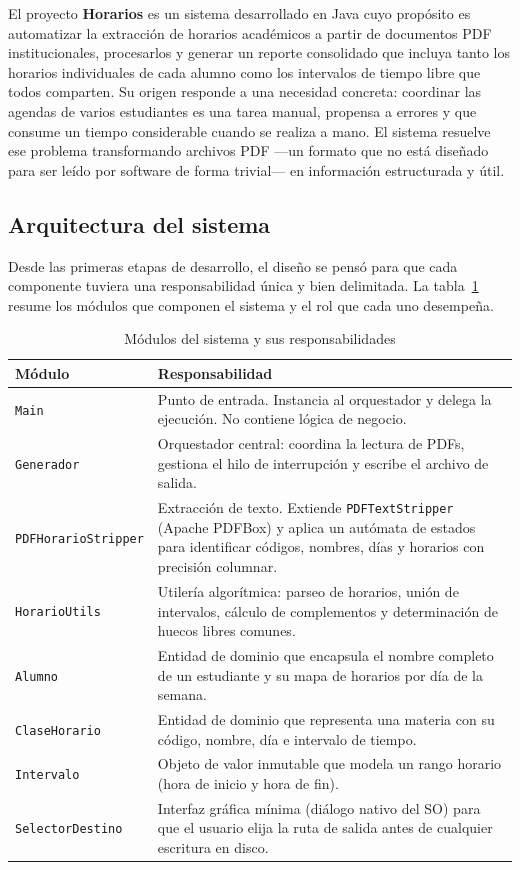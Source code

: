 El proyecto \textbf{Horarios} es un sistema desarrollado en Java cuyo propósito es automatizar la
extracción de horarios académicos a partir de documentos PDF institucionales, procesarlos y generar un
reporte consolidado que incluya tanto los horarios individuales de cada alumno como los intervalos
de tiempo libre que todos comparten. Su origen responde a una necesidad concreta: coordinar
las agendas de varios estudiantes es una tarea manual, propensa a errores y que consume un tiempo
considerable cuando se realiza a mano. El sistema resuelve ese problema transformando archivos PDF
—un formato que no está diseñado para ser leído por software de forma trivial— en información
estructurada y útil.

\subsection{Arquitectura del sistema}

Desde las primeras etapas de desarrollo, el diseño se pensó para que cada componente
tuviera una responsabilidad única y bien delimitada. La tabla~\ref{tab:modulos} resume los
módulos que componen el sistema y el rol que cada uno desempeña.

\begin{table}[H]
\centering
\caption{Módulos del sistema y sus responsabilidades}
\label{tab:modulos}
\begin{tabular}{|l|p{9.5cm}|}
\hline
\textbf{Módulo} & \textbf{Responsabilidad} \\
\hline
\texttt{Main}              & Punto de entrada. Instancia al orquestador y delega la ejecución. No contiene lógica de negocio. \\
\hline
\texttt{Generador}         & Orquestador central: coordina la lectura de PDFs, gestiona el hilo de interrupción y escribe el archivo de salida. \\
\hline
\texttt{PDFHorarioStripper} & Extracción de texto. Extiende \texttt{PDFTextStripper} (Apache PDFBox) y aplica un autómata de estados para identificar códigos, nombres, días y horarios con precisión columnar. \\
\hline
\texttt{HorarioUtils}      & Utilería algorítmica: parseo de horarios, unión de intervalos, cálculo de complementos y determinación de huecos libres comunes. \\
\hline
\texttt{Alumno}            & Entidad de dominio que encapsula el nombre completo de un estudiante y su mapa de horarios por día de la semana. \\
\hline
\texttt{ClaseHorario}      & Entidad de dominio que representa una materia con su código, nombre, día e intervalo de tiempo. \\
\hline
\texttt{Intervalo}         & Objeto de valor inmutable que modela un rango horario (hora de inicio y hora de fin). \\
\hline
\texttt{SelectorDestino}   & Interfaz gráfica mínima (diálogo nativo del SO) para que el usuario elija la ruta de salida antes de cualquier escritura en disco. \\
\hline
\end{tabular}
\end{table}


